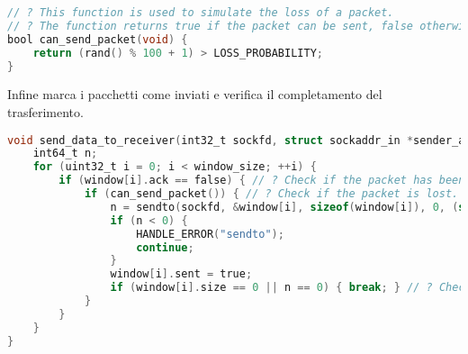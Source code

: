 \begin{lstlisting}[caption={\lstinlinebg{src/common.c}},language=C,keywords={void, LOSS_PROBABILITY, rand, bool, for, fread, PACKET_SIZE, break, ifdef, endif, IS_CLIENT, timeval, gettimeofday, send_data_to_receiver, wait_ack, while, true, ack_packet_t, recvfrom, WRITE_BYTE_ERROR, MAX_ERRORS, double, SPQR_KB, FILE_TRANSFER_FAILED, EXIT_SUCCESS, FILE_TRANSFER_COMPLETED, printf, sendto, SEQ_NUM_ERROR, sizeof, int8_t, int32_t, uint16_t, int64_t, struct, sockaddr, sockaddr_in, char, socklen_t, uint32_t, uint64_t, WINDOW_SIZE, stat, fstat, fileno, set_timeout, FILE, NULL, HANDLE_ERROR, return, TRANSFER_ERROR, if, else, perror, exit, fprintf, stderr, MAX_RETRIES, spqr_assert, spqr_free, fclose, free, spqr_assert_ptr, fseek, SEEK_END, ftell, rewind, malloc, memset, sizeof, packet_t, MAX_READ_LINE, MAX_WINDOW_SIZE, MAX_PACKETS, MAX_ACKS}]
// ? This function is used to simulate the loss of a packet.
// ? The function returns true if the packet can be sent, false otherwise.
bool can_send_packet(void) {
    return (rand() % 100 + 1) > LOSS_PROBABILITY;
}
\end{lstlisting}

Infine marca i pacchetti come inviati e verifica il completamento del trasferimento.

\begin{lstlisting}[caption={\lstinlinebg{src/protocol.c}},language=C,keywords={void, continue, can_send_packet, for, fread, PACKET_SIZE, break, ifdef, endif, IS_CLIENT, false, timeval, gettimeofday, wait_ack, while, true, ack_packet_t, recvfrom, WRITE_BYTE_ERROR, MAX_ERRORS, double, SPQR_KB, FILE_TRANSFER_FAILED, EXIT_SUCCESS, FILE_TRANSFER_COMPLETED, printf, sendto, SEQ_NUM_ERROR, sizeof, int8_t, int32_t, uint16_t, int64_t, struct, sockaddr, sockaddr_in, char, socklen_t, uint32_t, uint64_t, WINDOW_SIZE, stat, fstat, fileno, set_timeout, FILE, NULL, HANDLE_ERROR, return, TRANSFER_ERROR, if, else, perror, exit, fprintf, stderr, MAX_RETRIES, spqr_assert, spqr_free, fclose, free, spqr_assert_ptr, fseek, SEEK_END, ftell, rewind, malloc, memset, sizeof, packet_t, MAX_READ_LINE, MAX_WINDOW_SIZE, MAX_PACKETS, MAX_ACKS}]
void send_data_to_receiver(int32_t sockfd, struct sockaddr_in *sender_addr, packet_t *window, uint32_t window_size) {
    int64_t n;
    for (uint32_t i = 0; i < window_size; ++i) {
        if (window[i].ack == false) { // ? Check if the packet has been acknowledged.
            if (can_send_packet()) { // ? Check if the packet is lost.
                n = sendto(sockfd, &window[i], sizeof(window[i]), 0, (struct sockaddr *) sender_addr, sizeof(*sender_addr));
                if (n < 0) {
                    HANDLE_ERROR("sendto");
                    continue;
                }
                window[i].sent = true;
                if (window[i].size == 0 || n == 0) { break; } // ? Check if the file has been completely sent.
            }
        }
    }
}
\end{lstlisting}

